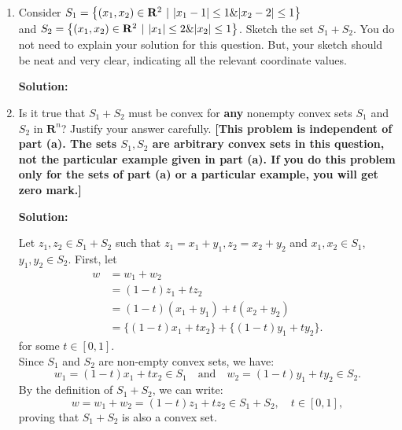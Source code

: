 \documentclass[11pt]{article}
\newenvironment{solution}
  {\par\noindent\textbf{Solution:}\par}
  {\par}
\begin{document}
\begin{enumerate}
    \begin{enumerate}[label=(\alph*)]
      \item Consider $S_1 = \left\{ (x_1,x_2) \in \mathbf{R}^2 \hspace{.05in} \vert \hspace{.05in}
        \vert x_1 - 1\vert \le 1 \& \vert x_2 -2 \vert \le 1\right\}$ \\  
        and $ S_2 = \left\{ (x_1,x_2) \in \mathbf{R}^2 \hspace{.05in} \vert \hspace{.05in}
        \vert x_1\vert \le 2 \& \vert x_2 \vert \le 1\right\}$. Sketch the set $S_1 + S_2$. You do not need to explain 
        your solution for this question. But, your sketch should be neat and very clear, indicating all the 
        relevant coordinate values.
        \begin{solution}
        \end{solution}
      \item Is it true that $S_1 + S_2$ must be convex for \textbf{any} nonempty convex sets $S_1$ and $S_2$ in
        $\mathbf{R}^n$? Justify your answer carefully. \textbf{[This problem is independent of part (a). 
        The sets $S_1,S_2$ are arbitrary convex sets in this question, not the particular example given in part (a).
        If you do this problem only for the sets of part (a) or a particular example, you will get zero mark.]}
        \begin{solution}
          Let $z_1,z_2 \in S_1 + S_2$ such that $z_1 = x_1 + y_1,z_2 = x_2 + y_2$ and $x_1,x_2 \in S_1$, $y_1,y_2 \in S_2$.
          First, let 
          \begin{align*}
            w &= w_1 + w_2 \\
              &= (1-t)z_1 + tz_2 \\
              &= (1-t)(x_1 + y_1) + t(x_2 + y_2) \\
              &= \{(1-t)x_1 + tx_2\} + \{(1-t)y_1 + ty_2\}.
          \end{align*}
          for some $t \in [0,1]$. \\ 
          Since $S_1$ and $S_2$ are non-empty convex sets, we have:
          \[
          w_1 = (1-t)x_1 + tx_2 \in S_1 \quad \text{and} \quad w_2 = (1-t)y_1 + ty_2 \in S_2.
          \]
          By the definition of $S_1 + S_2$, we can write:
          \[
          w = w_1 + w_2 = (1-t)z_1 + tz_2 \in S_1 + S_2, \quad t \in [0,1],
          \]
          proving that $S_1 + S_2$ is also a convex set.
      \end{solution}
    \end{enumerate}
\end{enumerate}
\end{document}
